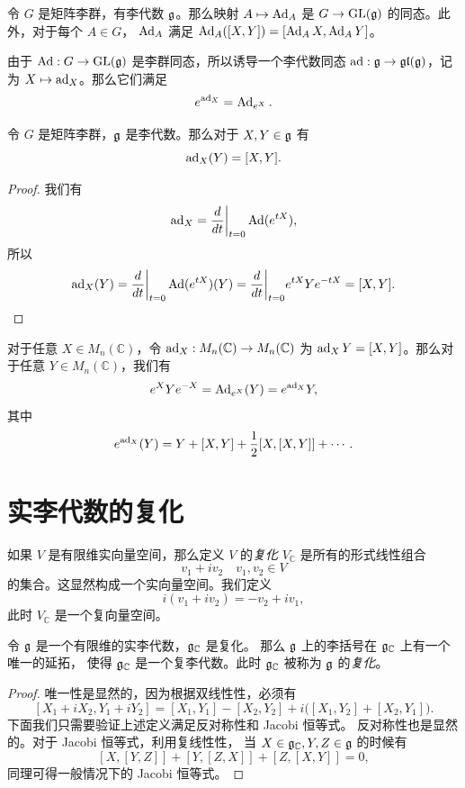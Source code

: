 \begin{proposition}
  令 $G$ 是矩阵李群，有李代数 $\mathfrak{g}$。那么映射 $A\mapsto \operatorname{Ad}_A$
  是 $G\to\operatorname{GL}(\mathfrak{g})$ 的同态。此外，对于每个 $A\in G$，
  $\operatorname{Ad}_A$ 满足 $\operatorname{Ad}_A([X,Y])=[\operatorname{Ad}_AX,\operatorname{Ad}_AY]$。
\end{proposition}

由于 $\operatorname{Ad}:G\to\operatorname{GL}(\mathfrak{g})$ 是李群同态，所以诱导一个李代数同态
$\operatorname{ad}:\mathfrak{g}\to \mathfrak{gl}(\mathfrak{g})$，记为 $X\mapsto \operatorname{ad}_X$。那么它们满足
\begin{equation}\label{eq:exp(ad)}
  e^{\operatorname{ad}_X}=\operatorname{Ad}_{e^X}.
\end{equation} 

\begin{proposition}
  令 $G$ 是矩阵李群，$\mathfrak{g}$ 是李代数。那么对于 $X,Y\in\mathfrak{g}$ 有
  \[
    \operatorname{ad}_X(Y)=[X,Y].
  \]
\end{proposition}
\begin{proof}
  我们有
  \[
    \operatorname{ad}_X=\frac{d}{dt}\bigg|_{t=0}\operatorname{Ad}({e^{tX}}),
  \]
  所以
  \[
    \operatorname{ad}_X(Y)=\frac{d}{dt}\bigg|_{t=0}\operatorname{Ad}({e^{tX}})(Y)
    =\frac{d}{dt}\bigg|_{t=0} e^{tX}Ye^{-tX}=[X,Y].\qedhere
  \]
\end{proof}

\begin{proposition}
  对于任意 $X\in M_n(\mathbb{C})$，令 $\operatorname{ad}_X:M_n(\mathbb{C})\to M_n(\mathbb{C})$
  为 $\operatorname{ad}_XY=[X,Y]$。那么对于任意 $Y\in M_n(\mathbb{C})$，我们有
  \[
    e^XYe^{-X}=\operatorname{Ad}_{e^X}(Y)=e^{\operatorname{ad}_X}Y,
  \]
  其中
  \[
    e^{\operatorname{ad}_X}(Y)=Y+[X,Y]+\frac{1}{2}[X,[X,Y]]+\cdots.
  \]
\end{proposition}

\section{实李代数的复化}

\begin{definition}
  如果 $V$ 是有限维实向量空间，那么定义 $V$ 的\emph{复化} $V_{\mathbb{C}}$
  是所有的形式线性组合
  \[
    v_1+iv_2\quad v_1,v_2\in V
  \]
  的集合。这显然构成一个实向量空间。我们定义 
  \[
    i(v_1+iv_2)=-v_2+iv_1,
  \]
  此时 $V_{\mathbb{C}}$ 是一个复向量空间。
\end{definition}

\begin{proposition}
  令 $\mathfrak{g}$ 是一个有限维的实李代数，$\mathfrak{g}_{\mathbb{C}}$ 是复化。
  那么 $\mathfrak{g}$ 上的李括号在 $\mathfrak{g}_{\mathbb{C}}$ 上有一个唯一的延拓，
  使得 $\mathfrak{g}_{\mathbb{C}}$ 是一个复李代数。此时 $\mathfrak{g}_{\mathbb{C}}$
  被称为 $\mathfrak{g}$ 的\emph{复化}。
\end{proposition}
\begin{proof}
  唯一性是显然的，因为根据双线性性，必须有
  \[
    [X_1+iX_2,Y_1+iY_2]=[X_1,Y_1]-[X_2,Y_2]+i\bigl(
      [X_1,Y_2]+[X_2,Y_1]
    \bigr).
  \]
  下面我们只需要验证上述定义满足反对称性和 Jacobi 恒等式。
  反对称性也是显然的。对于 Jacobi 恒等式，利用复线性性，
  当 $X\in\mathfrak{g}_{\mathbb{C}},Y,Z\in\mathfrak{g}$ 的时候有
  \[
    [X,[Y,Z]]+[Y,[Z,X]]+[Z,[X,Y]]=0,
  \]
  同理可得一般情况下的 Jacobi 恒等式。
\end{proof}

